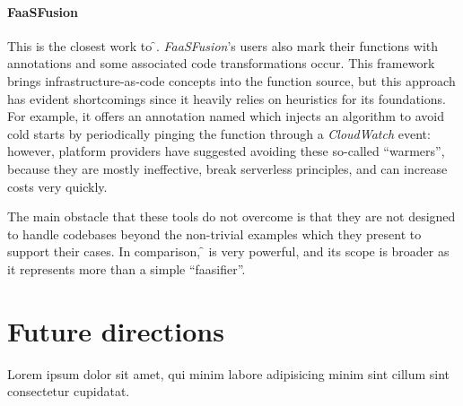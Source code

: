 \paragraph{\textbf{FaaSFusion} \cite{faasfusion}}
This is the closest work to \f{}.
\textit{FaaSFusion}'s users also mark their functions with annotations
and some associated code transformations occur.
This framework brings infrastructure-as-code concepts into the function source,
but this approach has evident shortcomings since it heavily relies on heuristics for its foundations.
For example, it offers an annotation named  which
injects an algorithm to avoid cold starts by periodically pinging the function
through a \textit{CloudWatch} event:
however, platform providers have suggested avoiding these so-called ``warmers'',
because they are mostly ineffective, break serverless principles, and can increase costs very quickly.

The main obstacle that these tools do not overcome is that they are
not designed to handle codebases beyond the non-trivial examples
which they present to support their cases.
In comparison, \f{} is very powerful, and its scope is broader
as it represents more than a simple ``faasifier''.

\section{Future directions}

Lorem ipsum dolor sit amet, qui minim labore adipisicing minim sint cillum sint consectetur cupidatat.
